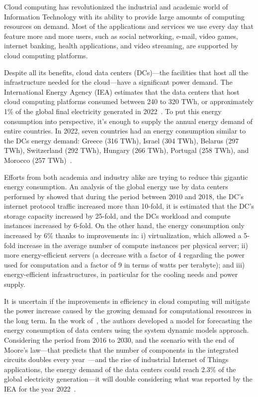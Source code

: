 
Cloud computing has revolutionized the industrial and academic world of Information Technology with its ability to provide large amounts of computing resources on demand. Most of the applications and services we use every day that feature more and more users, such as social networking, e-mail, video games, internet banking, health applications, and video streaming, are supported by cloud computing platforms.

Despite all its benefits, cloud data centers (DCs)---the facilities that host all the infrastructure needed for the cloud---have a significant power demand. The International Energy Agency (IEA) estimates that the data centers that host cloud computing platforms consumed between 240 to 320 TWh, or approximately 1\% of the global final electricity generated in 2022~\cite{IEA_2022}. To put this energy consumption into perspective, it's enough to supply the annual energy demand of entire countries. In 2022, seven countries had an energy consumption similar to the DCs energy demand: Greece (316 TWh), Israel (304 TWh), Belarus (297 TWh), Switzerland (292 TWh), Hungary (266 TWh), Portugal (258 TWh), and Morocco (257 TWh)~\cite{owidenergy}.


Efforts from both academia and industry alike are trying to reduce this gigantic energy consumption. An analysis of the global energy use by data centers performed by \citet{masanet2020recalibrating} showed that during the period between 2010 and 2018, the DC's internet protocol traffic increased more than 10-fold, it is estimated that the DC's storage capacity increased by 25-fold, and the DCs workload and compute instances increased by 6-fold. On the other hand, the energy consumption only increased by 6\% thanks to improvements in: i) virtualization, which allowed a 5-fold increase in the average number of compute instances per physical server; ii) more energy-efficient servers (a decrease with a factor of 4 regarding the power used for computation and a factor of 9 in terms of watts per terabyte); and iii) energy-efficient infrastructures, in particular for the cooling needs and power supply.

It is uncertain if the improvements in efficiency in cloud computing will mitigate the power increase caused by the growing demand for computational resources in the long term. In the work of~\citet{koot2021usage}, the authors developed a model for forecasting the energy consumption of data centers using the system dynamic models approach. Considering the period from 2016 to 2030, and the scenario with the end of Moore's law---that predicts that the number of components in the integrated circuits doubles every year~\cite{Mack_2011_moorelaw}---and the rise of industrial Internet of Things applications, the energy demand of the data centers could reach 2.3\% of the global electricity generation---it will double considering what was reported by the IEA for the year 2022~\cite{IEA_2022}.

